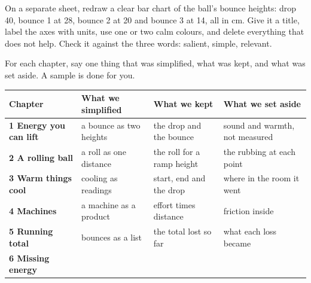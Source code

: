 \clearpage
\thispagestyle{fancy}
On a separate sheet, redraw a clear bar chart of the ball's bounce heights: drop 40, bounce 1 at 28, bounce 2 at 20 and bounce 3 at 14, all in cm. Give it a title, label the axes with units, use one or two calm colours, and delete everything that does not help. Check it against the three words: salient, simple, relevant.

\begin{center}
\end{center}

\clearpage
\thispagestyle{fancy}
For each chapter, say one thing that was simplified, what was kept, and what was set aside. A sample is done for you.

\renewcommand{\arraystretch}{2.3}
\begin{center}\sffamily\scriptsize
\begin{tabularx}{\textwidth}{|>{\bfseries}p{2.1cm}|X|X|X|}
\hline
\textbf{Chapter} & \textbf{What we simplified} & \textbf{What we kept} & \textbf{What we set aside} \\ \hline
1 Energy you can lift & a bounce as two heights & the drop and the bounce & sound and warmth, not measured \\ \hline
2 A rolling ball & a roll as one distance & the roll for a ramp height & the rubbing at each point \\ \hline
3 Warm things cool & cooling as readings & start, end and the drop & where in the room it went \\ \hline
4 Machines & a machine as a product & effort times distance & friction inside \\ \hline
5 Running total & bounces as a list & the total lost so far & what each loss became \\ \hline
6 Missing energy & & & \\ \hline
\end{tabularx}
\end{center}

